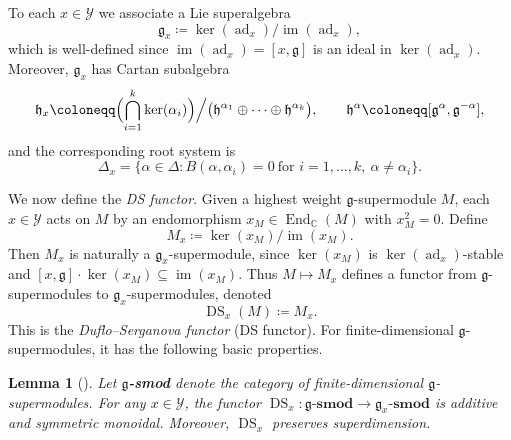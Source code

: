 \documentclass[11pt]{amsart}
\newcommand{\DS}{\operatorname{DS}}
\renewcommand{\Im}{\operatorname{im}}
\newcommand{\End}{\operatorname{End}}
\newcommand{\ad}{\operatorname{ad}}
\def\CC{{\mathbb C}}
\def\hh{{\mathfrak h}}
\def\YY{{\mathcal Y}}
\def\gg{{\mathfrak{g}}}
\def\gsmod{{\mathfrak{g}}\textbf{-smod}}
\theoremstyle{plain}
\newtheorem{lemma}[theorem]{Lemma}
\theoremstyle{remark}
\theoremstyle{definition}
\numberwithin{equation}{section}
\theoremstyle{remark}
\begin{document}
To each $x\in\YY$ we associate a Lie superalgebra
\begin{equation}
 \gg_x\coloneqq \ker(\ad_x)/\Im(\ad_x),
\end{equation}
which is well-defined since $\Im(\ad_x)=[x,\gg]$ is an ideal in $\ker(\ad_x)$. Moreover, $\gg_x$ has Cartan subalgebra
\begin{equation}\hh_x\coloneqq \Bigl(\bigcap_{i=1}^k \ker(\alpha_i)\Bigr)\Big/\bigl(\hh^{\alpha_1}\oplus\cdots\oplus\hh^{\alpha_k}\bigr),
 \qquad \hh^{\alpha}\coloneqq [\gg^{\alpha},\gg^{-\alpha}],
\end{equation}
and the corresponding root system is
\begin{equation}
 \Delta_x=\{\alpha\in\Delta : B(\alpha,\alpha_i)=0\ \text{for }i=1,\dots,k,\ \alpha\neq \alpha_i\}.
\end{equation}

We now define the \emph{DS functor}. Given a highest weight $\gg$-supermodule $M$, each $x\in\YY$ acts on $M$ by an endomorphism $x_M\in\End_{\CC}(M)$ with $x_M^{2}=0$. Define
\begin{equation}
 M_x\coloneqq \ker(x_M)/\Im(x_M).
\end{equation}
Then $M_x$ is naturally a $\gg_x$-supermodule, since $\ker(x_M)$ is $\ker(\ad_x)$-stable and
$[x,\gg]\cdot \ker(x_M)\subseteq \Im(x_M)$. Thus $M\mapsto M_x$ defines a functor from
$\gg$-supermodules to $\gg_x$-supermodules, denoted
\begin{equation}
 \DS_x(M)\coloneqq M_x.
\end{equation}
This is the \emph{Duflo--Serganova functor} (DS functor). For finite-dimensional $\gg$-supermodules, it has the following basic properties.

\begin{lemma}[{\cite[Section~2]{gorelik2022duflo}}]\label{DSTensorFunctor} Let $\gg$\textbf{-smod} denote the category of finite-dimensional $\gg$-supermodules. For any $x\in\YY$, the functor $\DS_x:\gsmod\to \gg_x\textbf{-smod}$ is additive and symmetric monoidal. Moreover, $\DS_x$ preserves superdimension.
\end{lemma}
\end{document}
